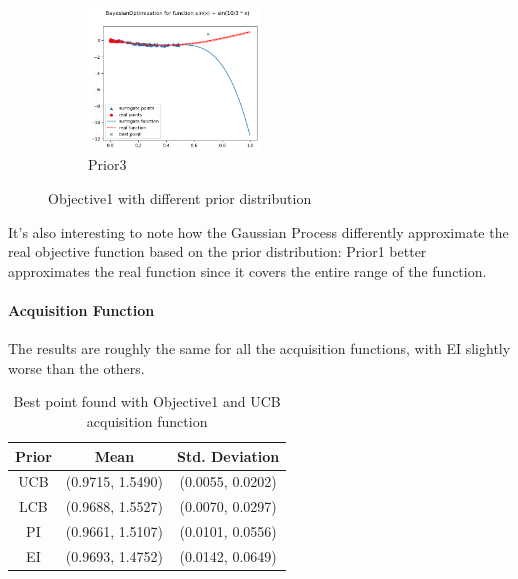 \begin{figure}[H]
\begin{subfigure}{\textwidth}
        \centering
        \includegraphics[width=0.5\textwidth]{lab6/imgs/obj1_pr3.png}
        \caption{Prior3}
    \end{subfigure}
    \caption{Objective1 with different prior distribution}
    \label{fig:bo-prior}
\end{figure}
It's also interesting to note how the Gaussian Process differently approximate the real objective function based on the prior distribution: Prior1 better approximates the real function since it covers the entire range of the function.

\paragraph*{Acquisition Function}
The results are roughly the same for all the acquisition functions, with EI slightly worse than the others.
\begin{table}[H]
    \centering
    \begin{tabular}{|c|c|c|}
        \textbf{Prior} & \textbf{Mean}    & \textbf{Std. Deviation} \\\hline
        UCB            & (0.9715, 1.5490) & (0.0055, 0.0202)        \\
        LCB            & (0.9688, 1.5527) & (0.0070, 0.0297)        \\
        PI             & (0.9661, 1.5107) & (0.0101, 0.0556)        \\
        EI             & (0.9693, 1.4752) & (0.0142, 0.0649)        \\
        \hline
    \end{tabular}
    \caption{Best point found with Objective1 and UCB acquisition function}
    \label{tab:acquisition}
\end{table}


